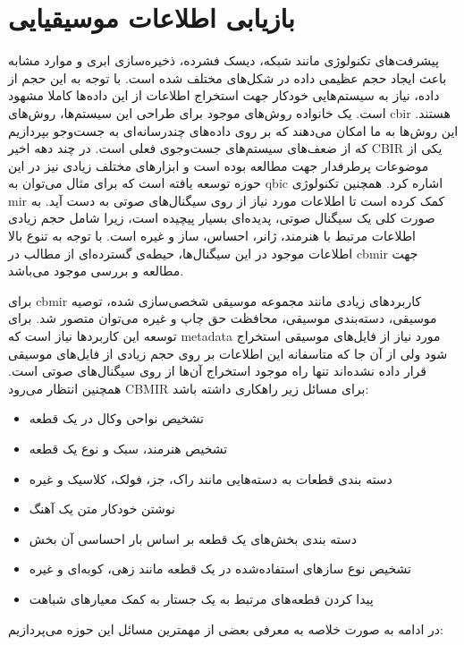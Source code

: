 \section{بازیابی اطلاعات موسیقیایی}
پیشرفت‌های تکنولوژی مانند شبکه، دیسک فشرده، ذخیره‌سازی ابری و موارد مشابه باعث
ایجاد حجم عظیمی داده در شکل‌های مختلف شده است. با توجه به این حجم از داده، نیاز
به سیستم‌هایی خودکار جهت استخراج اطلاعات از این داده‌ها کاملا مشهود است. یک
خانواده روش‌های موجود برای طراحی این سیستم‌ها، روش‌های \gls{cbir} هستند. این
روش‌ها به ما امکان می‌دهند که بر روی داده‌های چندرسانه‌ای به جست‌وجو بپردازیم که
از ضعف‌های سیستم‌های جست‌وجوی فعلی است. در چند دهه اخیر \gls{CBIR} یکی از
موضوعات پرطرفدار جهت مطالعه بوده است و ابزارهای مختلف زیادی نیز در این حوزه
توسعه یافته است که برای مثال می‌توان به \gls{qbic} اشاره کرد. همچنین تکنولوژی
\gls{mir} کمک کرده است تا اطلاعات مورد نیاز از روی سیگنال‌های صوتی به دست آید.
به صورت کلی یک سیگنال صوتی، پدیده‌ای بسیار پیچیده است، زیرا شامل حجم زیادی
اطلاعات مرتبط با هنرمند، ژانر، احساس، ساز و غیره است. با توجه به تنوع بالا
اطلاعات موجود در این سیگنال‌ها، حیطه‌ی گسترده‌ای از مطالب در \gls{cbmir} جهت
مطالعه و بررسی موجود می‌باشد.

برای \gls{cbmir} کاربردهای زیادی مانند مجموعه موسیقی شخصی‌سازی شده، توصیه
موسیقی، دسته‌بندی موسیقی، محافظت حق چاپ و غیره می‌توان متصور شد. برای توسعه این
کاربردها نیاز است که \gls{metadata} مورد نیاز از فایل‌های موسیقی استخراج شود ولی
از آن جا که متاسفانه این اطلاعات بر روی حجم زیادی از فایل‌های موسیقی قرار داده
نشده‌اند تنها راه موجود استخراج آن‌ها از روی سیگنال‌های صوتی است. همچنین انتظار
می‌رود \gls{CBMIR} برای مسائل زیر راهکاری داشته باشد:
\begin{itemize}
    \item تشخیص نواحی وکال در یک قطعه
    \item تشخیص هنرمند، سبک و نوع یک قطعه
    \item دسته بندی قطعات به دسته‌هایی مانند راک، جز، فولک، کلاسیک و غیره
    \item نوشتن خودکار متن یک آهنگ
    \item دسته بندی بخش‌های یک قطعه بر اساس بار احساسی آن بخش
    \item تشخیص نوع سازهای استفاده‌شده در یک قطعه مانند زهی، کوبه‌ای و غیره
    \item پیدا کردن قطعه‌های مرتبط به یک جستار به کمک معیارهای شباهت	
\end{itemize}

در ادامه به صورت خلاصه به معرفی بعضی از مهمترین مسائل این حوزه می‌پردازیم:

